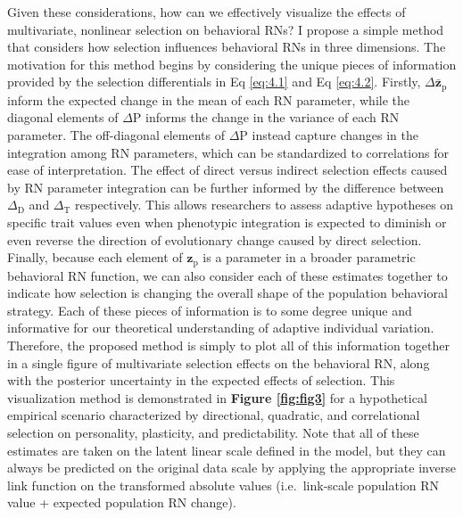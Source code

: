 \documentclass{article}
\begin{document}
Given these considerations, how can we effectively visualize the effects
of multivariate, nonlinear selection on behavioral RNs? I propose a
simple method that considers how selection influences behavioral RNs in
three dimensions. The motivation for this method begins by considering
the unique pieces of information provided by the selection differentials
in Eq \ref{eq:4.1} and Eq \ref{eq:4.2}. Firstly,
\(\Delta \bar{\boldsymbol{z}}_{\boldsymbol{\mathrm{p}}}\) inform the
expected change in the mean of each RN parameter, while the diagonal
elements of \(\Delta \boldsymbol{\mathrm{P}}\) informs the change in the
variance of each RN parameter. The off-diagonal elements of
\(\Delta \boldsymbol{\mathrm{P}}\) instead capture changes in the
integration among RN parameters, which can be standardized to
correlations for ease of interpretation. The effect of direct versus
indirect selection effects caused by RN parameter integration can be
further informed by the difference between \(\Delta_{\mathrm{D}}\) and
\(\Delta_{\mathrm{T}}\) respectively. This allows researchers to assess
adaptive hypotheses on specific trait values even when phenotypic
integration is expected to diminish or even reverse the direction of
evolutionary change caused by direct selection. Finally, because each
element of \(\boldsymbol{z}_{\boldsymbol{\mathrm{p}}}\) is a parameter
in a broader parametric behavioral RN function, we can also consider
each of these estimates together to indicate how selection is changing
the overall shape of the population behavioral strategy. Each of these
pieces of information is to some degree unique and informative for our
theoretical understanding of adaptive individual variation. Therefore,
the proposed method is simply to plot all of this information together
in a single figure of multivariate selection effects on the behavioral
RN, along with the posterior uncertainty in the expected effects of
selection. This visualization method is demonstrated in \textbf{Figure
\ref{fig:fig3}} for a hypothetical empirical scenario characterized by
directional, quadratic, and correlational selection on personality,
plasticity, and predictability. Note that all of these estimates are
taken on the latent linear scale defined in the model, but they can
always be predicted on the original data scale by applying the
appropriate inverse link function on the transformed absolute values
(i.e.~link-scale population RN value + expected population RN change).
\end{document}
